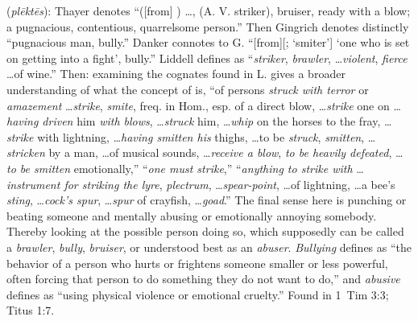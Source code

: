 \item[Abuser,]

(\textit{plēktēs}):
Thayer denotes ``([from] ) \ldots, (A. V. striker), bruiser, ready with a blow; a pugnacious, contentious, quarrelsome person.'' 
Then Gingrich denotes distinctly ``pugnacious man, bully.'' 
Danker connotes to G. ``[from][; `smiter'] `one who is set on getting into a fight', bully.'' 
Liddell defines  as ``\emph{striker}, \emph{brawler}, \ldots \emph{violent}, \emph{fierce} \ldots of wine.'' 
Then: examining the cognates found in L. gives a broader understanding of what the concept of  is,
 ``of persons \emph{struck with terror} or \emph{amazement} \ldots \emph{strike}, \emph{smite}, freq. in Hom., esp. of a direct blow, \ldots \emph{strike} one on \ldots \emph{having driven} him \emph{with blows}, \ldots \emph{struck} him, \ldots \emph{whip} on the horses to the fray, \ldots \emph{strike} with lightning, \ldots \emph{having smitten his} thighs, \ldots to be \emph{struck}, \emph{smitten}, \ldots \emph{stricken} by a man, \ldots of musical sounds, \ldots \emph{receive a blow}, \emph{to be heavily defeated}, \ldots \emph{to be smitten} emotionally,''
 ``\emph{one must strike},'' 
 ``\emph{anything to strike with} \ldots \emph{instrument for striking the lyre}, \emph{plectrum}, \ldots \emph{spear-point}, \ldots of lightning, \ldots a bee's \emph{sting}, \ldots \emph{cock's spur}, \ldots \emph{spur} of crayfish, \ldots \emph{goad}.''
The final sense here is punching or beating someone and mentally abusing or emotionally annoying somebody. Thereby looking at the possible person doing so, which supposedly can be called a \emph{brawler}, \emph{bully}, \emph{bruiser}, or understood best as an \emph{abuser}. \emph{Bullying} defines as ``the behavior of a person who hurts or frightens someone smaller or less powerful, often forcing that person to do something they do not want to do,'' and \emph{abusive} defines as ``using physical violence or emotional cruelty.''
Found in 1~Tim 3:3; Titus 1:7.
